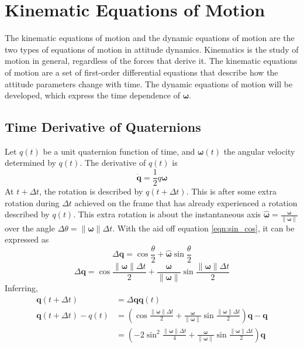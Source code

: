 \section{Kinematic Equations of Motion}
The kinematic equations of motion and the dynamic equations of motion are the two types of equations of motion in attitude dynamics. Kinematics is the study of motion in general, regardless of the forces that derive it. The kinematic equations of motion are a set of first-order differential equations that describe how the attitude parameters change with time. The dynamic equations of motion will be developed, which express the time dependence of $\boldsymbol{\omega}$.

\subsection{Time Derivative of Quaternions}
Let $q(t)$ be a unit quaternion function of time, and $\boldsymbol{\omega}(t)$ the angular velocity determined by $q(t)$. The derivative of $q(t)$ is
\begin{equation}\label{eqn:6.1}
    \dot{\mathbf{q}}=\frac{1}{2}q\boldsymbol{\omega}
\end{equation}
At $t+\Delta t$, the rotation is described by $q(t+\Delta t)$. This is after some extra rotation during $\Delta t$ achieved on the frame that has already experienced a rotation described by $q(t)$. This extra rotation is about the instantaneous axis $\widehat{\boldsymbol{\omega}}=\frac{\boldsymbol{\omega}}{\|\boldsymbol{\omega}\|}$ over the angle $\Delta \theta=\|\boldsymbol{\omega}\| \Delta t$. With the aid off equation \ref{eqn:sin_cos}, it can be expressed as
\begin{equation}
  \Delta \mathbf{q}=\cos \frac{\theta}{2}+\widehat{\boldsymbol{\omega}} \sin \frac{\theta}{2}  
\end{equation}
\begin{equation}
\Delta \mathbf{q}=\cos \frac{\|\boldsymbol{\omega}\| \Delta t}{2}+\frac{\boldsymbol{\omega}}{\|\boldsymbol{\omega}\|} \sin \frac{\|\boldsymbol{\omega}\| \Delta t}{2}    
\end{equation}
Inferring,
\begin{equation}
\begin{aligned}
\mathbf{q}(t+\Delta t)&=\Delta \mathbf{q} \mathbf{q}(t) \\
\mathbf{q}(t+\Delta t)-q(t)&=\left(\cos \frac{\|\boldsymbol{\omega}\| \Delta t}{2}+\frac{\boldsymbol{\omega}}{\|\boldsymbol{\omega}\|} \sin \frac{\|\boldsymbol{\omega}\| \Delta t}{2}\right) \mathbf{q}-\mathbf{q} \\
&=\left(-2 \sin ^{2} \frac{\|\boldsymbol{\omega}\| \Delta t}{4}+\frac{\boldsymbol{\omega}}{\|\boldsymbol{\omega}\|} \sin \frac{\|\boldsymbol{\omega}\| \Delta t}{2}\right) \mathbf{q}
\end{aligned}    
\end{equation}
